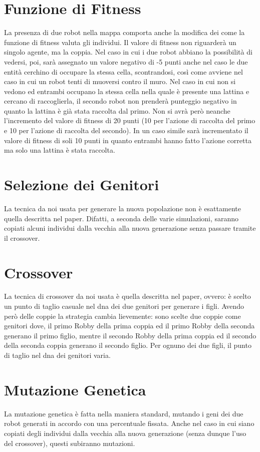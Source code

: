 \section{Funzione di Fitness}
La presenza di due robot nella mappa comporta anche la modifica dei come la
funzione di fitness valuta gli individui. Il valore di fitness non riguarderà un
singolo agente, ma la coppia.\newline
Nel caso in cui i due robot abbiano la possibilità di vedersi, poi, sarà
assegnato un valore negativo di -5 punti anche nel caso le due entità cerchino
di occupare la stessa cella, scontrandosi, così come avviene nel caso in cui un
robot tenti di muoversi contro il muro. Nel caso in cui non si vedono ed
entrambi occupano la stessa cella nella quale è presente una lattina e cercano
di raccoglierla, il secondo robot non prenderà punteggio negativo in quanto la
lattina è già stata raccolta dal primo. Non si avrà però neanche l'incremento
del valore di fitness di 20 punti (10 per l'azione di raccolta del primo e 10
per l'azione di raccolta del secondo). In un caso simile sarà incrementato il
valore di fitness di soli 10 punti in quanto entrambi hanno fatto l'azione
corretta ma solo una lattina è stata raccolta.

\section{Selezione dei Genitori}
La tecnica da noi usata per generare la nuova popolazione non è esattamente
quella descritta nel paper. Difatti, a seconda delle varie simulazioni, saranno
copiati alcuni individui dalla vecchia alla nuova generazione senza passare
tramite il crossover.

\section{Crossover}
La tecnica di crossover da noi usata è quella descritta nel paper, ovvero: è
scelto un punto di taglio casuale nel dna dei due genitori per generare i figli.
Avendo però delle coppie la strategia cambia lievemente: sono scelte due coppie
come genitori dove, il primo Robby della prima coppia ed il primo Robby della
seconda generano il primo figlio, mentre il secondo Robby della prima coppia ed
il secondo della seconda coppia generano il secondo figlio. Per ognuno dei due
figli, il punto di taglio nel dna dei genitori varia.

\section{Mutazione Genetica}
La mutazione genetica è fatta nella maniera standard, mutando i geni dei due
robot generati in accordo con una percentuale fissata. Anche nel caso in cui
siano copiati degli individui dalla vecchia alla nuova generazione (senza dunque
l'uso del crossover), questi subiranno mutazioni.
